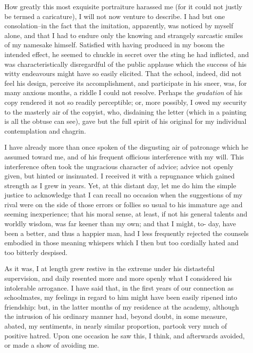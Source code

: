 \documentclass[12pt]{book}
\begin{document}
     How greatly this most exquisite portraiture harassed me (for
it could not justly be termed a caricature), I will not now venture
to describe.  I had but one consolation--in the fact that the
imitation, apparently, was noticed by myself alone, and that I had
to endure only the knowing and strangely sarcastic smiles of my
namesake himself.  Satisfied with having produced in my bosom the
intended effect, he seemed to chuckle in secret over the sting he
had inflicted, and was characteristically disregardful of the
public applause which the success of his witty endeavours might
have so easily elicited.  That the school, indeed, did not feel his
design, perceive its accomplishment, and participate in his
sneer, was, for many anxious months, a riddle I could not resolve. 
Perhaps the \emph{gradation} of his copy rendered it not so readily
perceptible; or, more possibly, I owed my security to the masterly
air of the copyist, who, disdaining the letter (which in a painting
is all the obtuse can see), gave but the full spirit of his
original for my individual contemplation and chagrin.

     I have already more than once spoken of the disgusting air of
patronage which he assumed toward me, and of his frequent officious
interference with my will.  This interference often took the
ungracious character of advice; advice not openly given, but hinted
or insinuated.  I received it with a repugnance which gained
strength as I grew in years.  Yet, at this distant day, let me do
him the simple justice to acknowledge that I can recall no occasion
when the suggestions of my rival were on the side of those errors
or follies so usual to his immature age and seeming inexperience;
that his moral sense, at least, if not his general talents and
worldly wisdom, was far keener than my own; and that I might, to-
day, have been a better, and thus a happier man, had I less
frequently rejected the counsels embodied in those meaning whispers
which I then but too cordially hated and too bitterly despised.

     As it was, I at length grew restive in the extreme under his
distasteful supervision, and daily resented more and more openly
what I considered his intolerable arrogance.  I have said that, in
the first years of our connection as schoolmates, my feelings in
regard to him might have been easily ripened into friendship: but,
in the latter months of my residence at the academy, although the
intrusion of his ordinary manner had, beyond doubt, in some
measure, abated, my sentiments, in nearly similar proportion,
partook very much of positive hatred.  Upon one occasion he saw
this, I think, and afterwards avoided, or made a show of avoiding
me.
\end{document}
